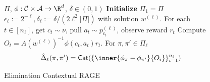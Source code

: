 \documentclass{article}
\newcommand{\mc}[1]{\mathcal{#1}}
\newcommand{\1}{\mathbf{1}}
\begin{document}
\begin{figure}
    \centering
\begin{minipage}[t]{0.49\textwidth}
\begin{algorithm}[H]
    \centering
    \caption{Elimination Contextual RAGE}
    \small
    \begin{algorithmic}[1]\label{alg:elimination}
    \REQUIRE  $\Pi$, $\phi : \mc{C} \times \mc{A} \rightarrow \R^d$, $\delta\in (0,1)$
    \STATE \textbf{Initialize} $\Pi_{1}=\Pi$
    \STATE $\epsilon_\ell:=2^{-\ell}, \delta_{\ell} := \delta/(2\ell^2|\Pi|)$
    with solution $w^{(\ell)}$.
    \STATE %
    For each $t\in [n_\ell]$, get $c_t\sim \nu$, pull $a_t\sim p^{(\ell)}_{c_t}$, observe reward $r_t$ 
    \STATE Compute $O_t=A(w^{(\ell)})^{-1} \phi(c_t,a_t) r_t$.  
    \STATE For  $\pi,\pi' \in \Pi_\ell$  \[\hat{\Delta}_{\ell}(\pi,\pi') = {\sf Cat}( \{ \inner{\phi_\pi - \phi_{\pi'}}{O_{i}} \}_{i=1}^{n_\ell})\]\vspace{-15pt}

\end{algorithmic}
\end{algorithm}
\end{minipage}
\end{figure}
\end{document}
